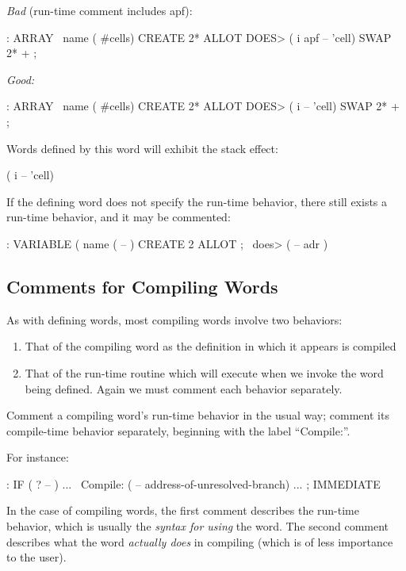 \bigskip\noindent
\emph{Bad} (run-time comment includes apf):
\begin{Code}
: ARRAY   \  name  ( #cells)
   CREATE 2* ALLOT
   DOES>   ( i apf -- 'cell)  SWAP  2* + ;
\end{Code}
\goodbreak\noindent
\emph{Good:}
\begin{Code}
: ARRAY   \  name  ( #cells)
   CREATE 2* ALLOT
    DOES>  ( i -- 'cell)  SWAP  2* + ;
\end{Code}
Words defined by this word  will exhibit the stack effect:
\begin{Code}
( i -- 'cell)
\end{Code}
If the defining word does not specify the run-time behavior, there still
exists a run-time behavior, and it may be commented:
\begin{Code}
: VARIABLE   (  name  ( -- )  CREATE  2 ALLOT ;
   \ does>   ( -- adr )
\end{Code}

\subsection{Comments for Compiling Words}
As with defining words, most compiling words involve two behaviors:
\begin{enumerate}
\item That of the compiling word as the definition in which it appears
is compiled
\item That of the run-time routine which will execute when we invoke
the word being defined.  Again we must comment each behavior
separately.
\end{enumerate}

\begin{tip}
Comment a compiling word's run-time behavior in the usual way; comment
its compile-time behavior separately, beginning with the label
``Compile:''.
\end{tip}
For instance:
\begin{Code}
: IF   ( ? -- ) ...
\ Compile:   ( -- address-of-unresolved-branch)
   ... ; IMMEDIATE
\end{Code}
In the case of compiling words, the first comment describes the
run-time behavior, which is usually the \emph{syntax for using} the
word.  The second comment describes what the word \emph{actually does}
in compiling (which is of less importance to the user).

